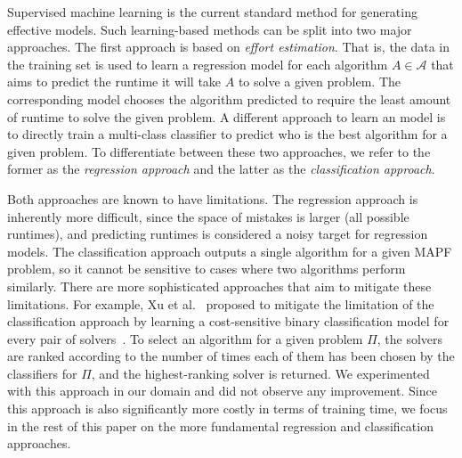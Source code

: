 \documentclass[letterpaper]{article} %
\begin{document}
Supervised machine learning is the current standard method for generating effective \AS models. 
Such learning-based methods can be split into two major approaches. 
The first approach is based on \emph{effort estimation}. That is, the data in the training set is used to learn a regression model for each algorithm $A\in\mathcal{A}$ that aims to predict the runtime it will take $A$ to solve a given problem. 
The corresponding \AS model chooses the algorithm predicted to require the least amount of runtime to solve the given problem.  
A different approach to learn an \AS model is to directly train a multi-class classifier to predict who is the best algorithm for a given problem.  %
To differentiate between these two approaches, we refer to the former as the \emph{regression approach} and the latter as the \emph{classification approach}. 


Both approaches are known to have limitations. 
The regression approach is inherently more difficult, since the space of mistakes is larger (all possible runtimes), and predicting runtimes is considered a noisy target for regression models. The classification approach outputs a single algorithm for a given MAPF problem, so it cannot be sensitive to cases where two algorithms perform similarly. %
There are more sophisticated approaches that aim to mitigate these limitations. For example, Xu et al.~ proposed to mitigate the limitation of the classification approach by learning a cost-sensitive binary classification model for every pair of  solvers~\cite{xu2012satzilla2012}. To select an algorithm for a given problem $\Pi$, the solvers are ranked according to the number of times each of them has been chosen by the classifiers for $\Pi$, and the highest-ranking solver is returned. 
We experimented with this approach in our domain and did not observe any improvement. Since this approach is also significantly more costly in terms of training time, we focus in the rest of this paper on the more fundamental regression and classification approaches.  
\end{document}
